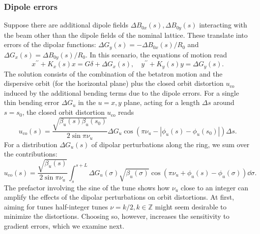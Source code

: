 \subsubsection{Dipole errors}
    Suppose there are additional dipole fields $\Delta B_{0x}(s), \Delta B_{0y}(s)$ interacting with the beam other than the dipole fields of the nominal lattice. These translate into errors of the dipolar functions: $\Delta G_y(s)=-\Delta B_{0x}(s)/R_0$ and $\Delta G_x(s)=\Delta B_{0y}(s)/R_0$. In this scenario, the equations of motion read
    \begin{equation}
        x^{\prime\prime}+K_x(s)x=G\delta + \Delta G_x(s), \quad
        y^{\prime\prime}+K_y(s)y = \Delta G_y(s).
        \label{eq:dip_errEOM}
    \end{equation}
    The solution consists of the combination of the betatron motion and the dispersive orbit (for the horizontal plane) plus the closed orbit distortion $u_{\text{co}}$ induced by the additional bending terms due to the dipole errors. For a single thin bending error $\Delta G_u$ in the $u=x,y$ plane, acting for a length $\Delta s$ around $s=s_0$, the closed orbit distortion $u_{\text{co}}$ reads
    \begin{equation}
        u_{\text{co}}(s) = \frac{\sqrt{\beta_u(s)\beta_u(s_0)}}{2\sin\pi\nu_u}\Delta G_u\cos( \pi\nu_u - |\phi_u(s)-\phi_u(s_0)|)\Delta s.
        \label{eq:cod}
    \end{equation}
    For a distribution $\Delta G_u(s)$ of dipolar perturbations along the ring, we sum over the contributions:
    \begin{equation}
        u_{\text{co}}(s) = \frac{\sqrt{\beta_u(s)}}{2\sin\pi\nu_u}\int_{s}^{s+L} \Delta G_u(\sigma)\sqrt{\beta_u(\sigma)}\cos(\pi\nu_u + \phi_u(s) - \phi_u(\sigma))\dd{\sigma}.
        \label{eq:co_dist}
    \end{equation}
    The prefactor involving the sine of the tune shows how $\nu_{u}$ close to an integer can amplify the effects of the dipolar perturbations on orbit distortions. At first, aiming for tunes half-integer tunes $\nu=k/2, k\in\mathbb{Z}$ might seem desirable to minimize the distortions. Choosing so, however, increases the sensitivity to gradient errors, which we examine next.

